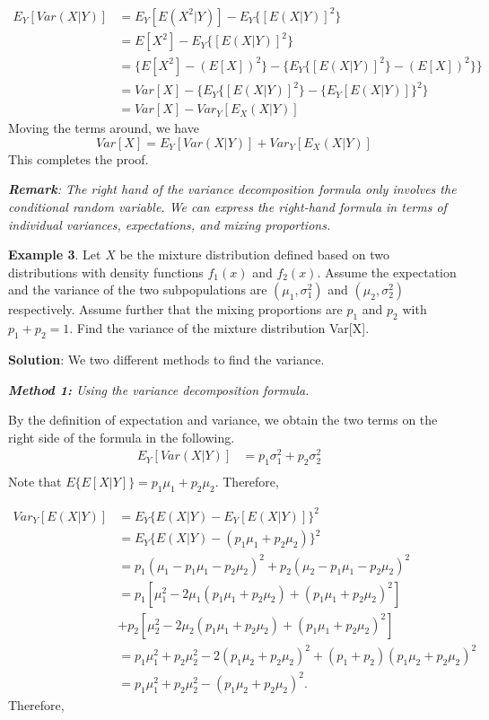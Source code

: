\documentclass[
]{book}
\begin{document}
\[
\begin{aligned}
E_Y[Var(X|Y)] & =E_Y[E(X^2|Y)] - E_Y\{ [E(X|Y)]^2\} &\\
     & = E[X^2] - E_Y\{ [E(X|Y)]^2\} &\\
     & = \{E[X^2] - (E[X])^2 \} - \{ E_Y\{ [E(X|Y)]^2\} - (E[X])^2 \}\} &\\
     & = Var[X] - \{ E_Y\{ [E(X|Y)]^2\} - \{E_Y[E(X|Y)]\}^2 \} &\\
     & = Var[X] - Var_Y[E_X(X|Y)]
\end{aligned}
\]
Moving the terms around, we have
\[
Var[X] = E_Y[Var(X|Y)] + Var_Y[E_X(X|Y)]
\]
This completes the proof.

\emph{\textbf{Remark}: The right hand of the variance decomposition formula only involves the conditional random variable. We can express the right-hand formula in terms of individual variances, expectations, and mixing proportions.}

\hfill\break

\textbf{Example 3}. Let \(X\) be the mixture distribution defined based on two distributions with density functions \(f_1(x)\) and \(f_2(x)\). Assume the expectation and the variance of the two subpopulations are \((\mu_1, \sigma_1^2)\) and \((\mu_2, \sigma_2^2)\) respectively. Assume further that the mixing proportions are \(p_1\) and \(p_2\) with \(p_1 + p_2 = 1\). Find the variance of the mixture distribution Var{[}X{]}.

\textbf{Solution}: We two different methods to find the variance.

\emph{\textbf{Method 1:} Using the variance decomposition formula.}

By the definition of expectation and variance, we obtain the two terms on the right side of the formula in the following.
\[
\begin{aligned}
E_Y[Var(X|Y)] & = p_1\sigma_1^2 + p_2\sigma_2^2  &\\
\end{aligned}
\]
Note that \(E\{E[X|Y]\} = p_1\mu_1 + p_2\mu_2\). Therefore,

\[
\begin{aligned}
Var_Y[E(X|Y)] & =  E_Y\{E(X|Y) - E_Y[E(X|Y)]\}^2  &\\
              & =  E_Y\{E(X|Y) - (p_1\mu_1 + p_2\mu_2)\}^2  &\\
              & =  p_1(\mu_1-p_1\mu_1-p_2\mu_2)^2 + p_2(\mu_2-p_1\mu_1-p_2\mu_2)^2 &\\
              & =  p_1[\mu_1^2 -2\mu_1 (p_1\mu_1+p_2\mu_2) + (p_1\mu_1+p_2\mu_2)^2]   &\\
              &   + p_2[\mu_2^2 -2\mu_2 (p_1\mu_1+p_2\mu_2) + (p_1\mu_1+p_2\mu_2)^2] &\\
              & = p_1\mu_1^2 + p_2\mu_2^2 -2(p_1\mu_2+p_2\mu_2)^2 + (p_1+p_2)(p_1\mu_2+p_2\mu_2)^2 &\\
              & = p_1\mu_1^2 + p_2\mu_2^2 -(p_1\mu_2+p_2\mu_2)^2.
\end{aligned}
\]
Therefore,
\end{document}
